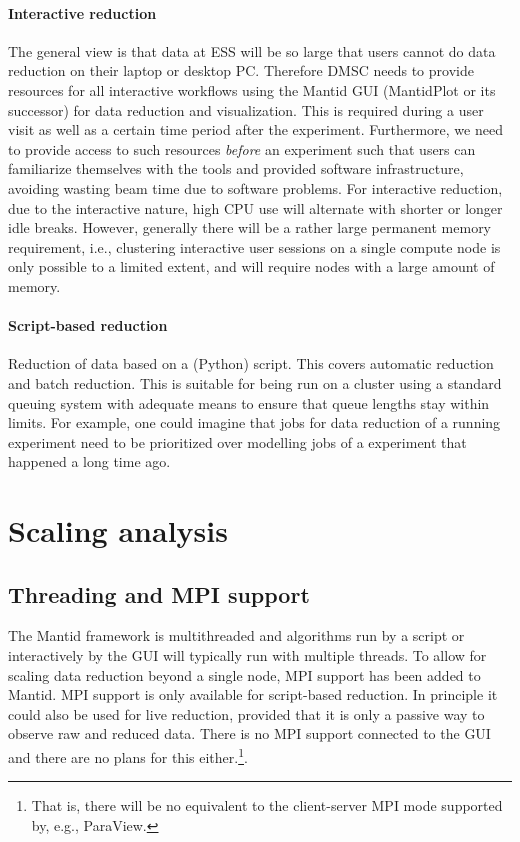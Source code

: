 \documentclass[a4paper,english,numbers=noenddot,bibliography=totoc,chapterprefix=on,DIV=12]{scrartcl}
\newcommand{\mantid}{Mantid\xspace}
\begin{document}
\paragraph{Interactive reduction} 
The general view is that data at ESS will be so large that users cannot do data reduction on their laptop or desktop PC. Therefore DMSC needs to provide resources for all interactive workflows using the \mantid GUI (MantidPlot or its successor) for data reduction and visualization.
This is required during a user visit as well as a certain time period after the experiment.
Furthermore, we need to provide access to such resources \emph{before} an experiment such that users can familiarize themselves with the tools and provided software infrastructure, avoiding wasting beam time due to software problems.
For interactive reduction, due to the interactive nature, high CPU use will alternate with shorter or longer idle breaks.
However, generally there will be a rather large permanent memory requirement, i.e., clustering interactive user sessions on a single compute node is only possible to a limited extent, and will require nodes with a large amount of memory.

\paragraph{Script-based reduction}
Reduction of data based on a (Python) script.
This covers automatic reduction and batch reduction.
This is suitable for being run on a cluster using a standard queuing system with adequate means to ensure that queue lengths stay within limits.
For example, one could imagine that jobs for data reduction of a running experiment need to be prioritized over modelling jobs of a experiment that happened a long time ago.

\section{Scaling analysis}
\label{sec:scaling-analysis}

\subsection{Threading and MPI support}
\label{sec:threading-and-mpi-support}

The \mantid framework is multithreaded and algorithms run by a script or interactively by the GUI will typically run with multiple threads.
To allow for scaling data reduction beyond a single node, MPI support has been added to \mantid.
MPI support is only available for script-based reduction.
In principle it could also be used for live reduction, provided that it is only a passive way to observe raw and reduced data.
There is no MPI support connected to the GUI and there are no plans for this either.\footnote{That is, there will be no equivalent to the client-server MPI mode supported by, e.g., ParaView.}.
\end{document}
